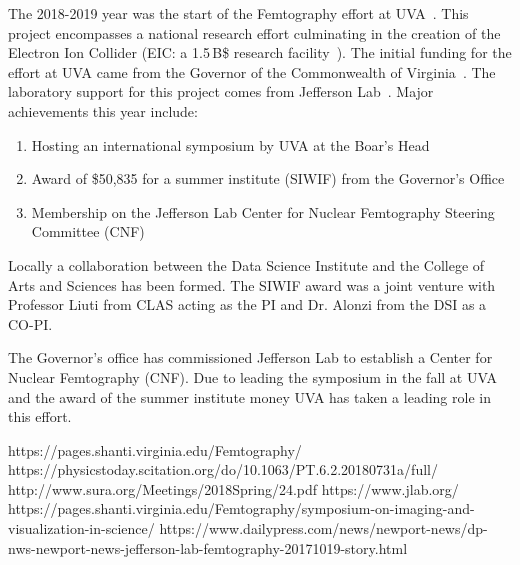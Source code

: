 The 2018-2019 year was the start of the Femtography effort at UVA~\cite{ref:siwif}. This project encompasses a national research effort culminating in the creation of the Electron Ion Collider (EIC: a 1.5\,B\$ research facility~\cite{ref:eic}). The initial funding for the effort at UVA came from the Governor of the Commonwealth of Virginia~\cite{ref:cnf}. The laboratory support for this project comes from Jefferson Lab~\cite{ref:jlab}. Major achievements this year include:

\begin{enumerate}
\item Hosting an international symposium by UVA at the Boar's Head~\cite{ref:symp}
\item Award of \$50,835 for a summer institute (SIWIF) from the Governor's Office
\item Membership on the Jefferson Lab Center for Nuclear Femtography Steering Committee (CNF)
\end{enumerate}

Locally a collaboration between the Data Science Institute and the College of Arts and Sciences has been formed. The SIWIF award was a joint venture with Professor Liuti from CLAS acting as the PI and Dr. Alonzi from the DSI as a CO-PI.

The Governor's office has commissioned Jefferson Lab to establish a Center for Nuclear Femtography (CNF). Due to leading the symposium in the fall at UVA and the award of the summer institute money UVA has taken a leading role in this effort.

\pagebreak

\begin{thebibliography}{99}
 https://pages.shanti.virginia.edu/Femtography/
 https://physicstoday.scitation.org/do/10.1063/PT.6.2.20180731a/full/
 http://www.sura.org/Meetings/2018Spring/24.pdf
 https://www.jlab.org/
 https://pages.shanti.virginia.edu/Femtography/symposium-on-imaging-and-visualization-in-science/
 https://www.dailypress.com/news/newport-news/dp-nws-newport-news-jefferson-lab-femtography-20171019-story.html
\end{thebibliography}
